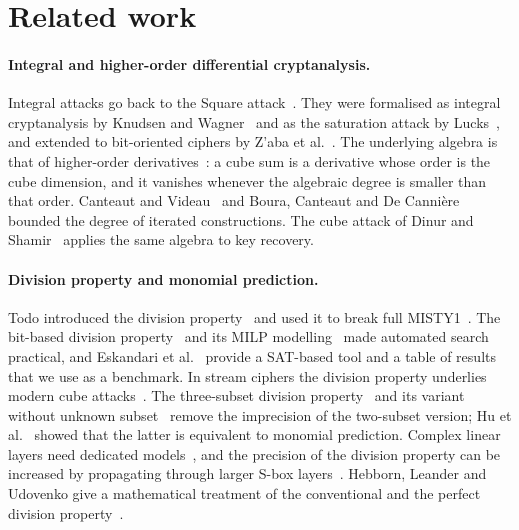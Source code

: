 \documentclass[11pt,a4paper]{article}
\theoremstyle{definition}
\theoremstyle{remark}
\begin{document}
\section{Related work}\label{sec:related}

\paragraph{Integral and higher-order differential cryptanalysis.} Integral attacks go back to the Square attack~\cite{square1997}. They were formalised as integral cryptanalysis by Knudsen and Wagner~\cite{knudsen2002integral} and as the saturation attack by Lucks~\cite{lucks2001}, and extended to bit-oriented ciphers by Z'aba et al.~\cite{zaba2008}. The underlying algebra is that of higher-order derivatives~\cite{lai1994,knudsen1994}: a cube sum is a derivative whose order is the cube dimension, and it vanishes whenever the algebraic degree is smaller than that order. Canteaut and Videau~\cite{canteaut2002} and Boura, Canteaut and De Cannière~\cite{boura2011} bounded the degree of iterated constructions. The cube attack of Dinur and Shamir~\cite{dinur2009} applies the same algebra to key recovery.

\paragraph{Division property and monomial prediction.} Todo introduced the division property~\cite{todo2015} and used it to break full MISTY1~\cite{todo2015misty}. The bit-based division property~\cite{todo2016bit} and its MILP modelling~\cite{xiang2016milp} made automated search practical, and Eskandari et al.~\cite{eskandari2018} provide a SAT-based tool and a table of results that we use as a benchmark. In stream ciphers the division property underlies modern cube attacks~\cite{todo2017cube,wang2018cube}. The three-subset division property~\cite{huwang2019} and its variant without unknown subset~\cite{hao2020} remove the imprecision of the two-subset version; Hu et al.~\cite{hu2020mp} showed that the latter is equivalent to monomial prediction. Complex linear layers need dedicated models~\cite{hu2020linear,zhang2019}, and the precision of the division property can be increased by propagating through larger S-box layers~\cite{derbez2020}. Hebborn, Leander and Udovenko give a mathematical treatment of the conventional and the perfect division property~\cite{hebborn2023math}.
\end{document}
